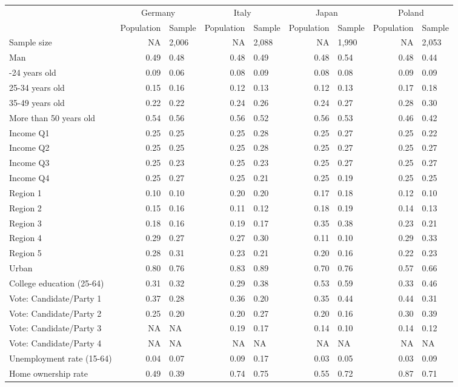 
\begin{tabular}[t]{lrlrlrlrl}
\toprule
\multicolumn{1}{c}{} & \multicolumn{2}{c}{Germany} & \multicolumn{2}{c}{Italy} & \multicolumn{2}{c}{Japan} & \multicolumn{2}{c}{Poland} \\
\cmidrule(l{3pt}r{3pt}){2-3} \cmidrule(l{3pt}r{3pt}){4-5} \cmidrule(l{3pt}r{3pt}){6-7} \cmidrule(l{3pt}r{3pt}){8-9}
  & Population & Sample & Population & Sample & Population & Sample & Population & Sample\\
\midrule
Sample size & NA & 2,006 & NA & 2,088 & NA & 1,990 & NA & 2,053\\
\midrule
Man & 0.49 & 0.48 & 0.48 & 0.49 & 0.48 & 0.54 & 0.48 & 0.44\\
\addlinespace
18-24 years old & 0.09 & 0.06 & 0.08 & 0.09 & 0.08 & 0.08 & 0.09 & 0.09\\
25-34 years old & 0.15 & 0.16 & 0.12 & 0.13 & 0.12 & 0.13 & 0.17 & 0.18\\
35-49 years old & 0.22 & 0.22 & 0.24 & 0.26 & 0.24 & 0.27 & 0.28 & 0.30\\
More than 50 years old & 0.54 & 0.56 & 0.56 & 0.52 & 0.56 & 0.53 & 0.46 & 0.42\\
\addlinespace
Income Q1 & 0.25 & 0.25 & 0.25 & 0.28 & 0.25 & 0.27 & 0.25 & 0.22\\
Income Q2 & 0.25 & 0.25 & 0.25 & 0.28 & 0.25 & 0.27 & 0.25 & 0.27\\
Income Q3 & 0.25 & 0.23 & 0.25 & 0.23 & 0.25 & 0.27 & 0.25 & 0.27\\
Income Q4 & 0.25 & 0.27 & 0.25 & 0.21 & 0.25 & 0.19 & 0.25 & 0.25\\
\addlinespace
Region 1 & 0.10 & 0.10 & 0.20 & 0.20 & 0.17 & 0.18 & 0.12 & 0.10\\
Region 2 & 0.15 & 0.16 & 0.11 & 0.12 & 0.18 & 0.19 & 0.14 & 0.13\\
Region 3 & 0.18 & 0.16 & 0.19 & 0.17 & 0.35 & 0.38 & 0.23 & 0.21\\
Region 4 & 0.29 & 0.27 & 0.27 & 0.30 & 0.11 & 0.10 & 0.29 & 0.33\\
Region 5 & 0.28 & 0.31 & 0.23 & 0.21 & 0.20 & 0.16 & 0.22 & 0.23\\
\addlinespace
Urban & 0.80 & 0.76 & 0.83 & 0.89 & 0.70 & 0.76 & 0.57 & 0.66\\
\addlinespace
College education (25-64) & 0.31 & 0.32 & 0.29 & 0.38 & 0.53 & 0.59 & 0.33 & 0.46\\
\addlinespace
Vote: Candidate/Party 1 & 0.37 & 0.28 & 0.36 & 0.20 & 0.35 & 0.44 & 0.44 & 0.31\\
Vote: Candidate/Party 2 & 0.25 & 0.20 & 0.20 & 0.27 & 0.20 & 0.16 & 0.30 & 0.39\\
Vote: Candidate/Party 3 & NA & NA & 0.19 & 0.17 & 0.14 & 0.10 & 0.14 & 0.12\\
Vote: Candidate/Party 4 & NA & NA & NA & NA & NA & NA & NA & NA\\
\addlinespace
Unemployment rate (15-64) & 0.04 & 0.07 & 0.09 & 0.17 & 0.03 & 0.05 & 0.03 & 0.09\\
\addlinespace
Home ownership rate & 0.49 & 0.39 & 0.74 & 0.75 & 0.55 & 0.72 & 0.87 & 0.71\\
\bottomrule
\end{tabular}